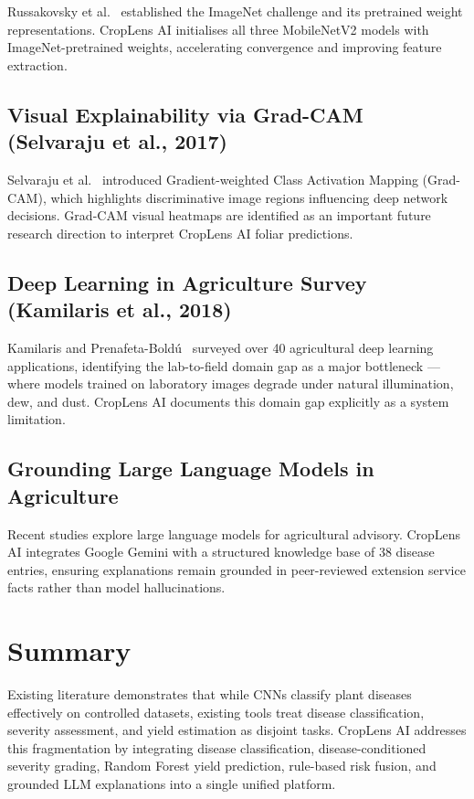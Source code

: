 Russakovsky et al.~\cite{russakovsky2015} established the ImageNet challenge and its pretrained weight representations. CropLens AI initialises all three MobileNetV2 models with ImageNet-pretrained weights, accelerating convergence and improving feature extraction.

\subsection{Visual Explainability via Grad-CAM (Selvaraju et al., 2017)}

Selvaraju et al.~\cite{selvaraju2017} introduced Gradient-weighted Class Activation Mapping (Grad-CAM), which highlights discriminative image regions influencing deep network decisions. Grad-CAM visual heatmaps are identified as an important future research direction to interpret CropLens AI foliar predictions.

\subsection{Deep Learning in Agriculture Survey (Kamilaris et al., 2018)}

Kamilaris and Prenafeta-Bold\'{u}~\cite{kamilaris2018} surveyed over 40 agricultural deep learning applications, identifying the lab-to-field domain gap as a major bottleneck --- where models trained on laboratory images degrade under natural illumination, dew, and dust. CropLens AI documents this domain gap explicitly as a system limitation.

\subsection{Grounding Large Language Models in Agriculture}

Recent studies explore large language models for agricultural advisory. CropLens AI integrates Google Gemini with a structured knowledge base of 38 disease entries, ensuring explanations remain grounded in peer-reviewed extension service facts rather than model hallucinations.

\section{Summary}

Existing literature demonstrates that while CNNs classify plant diseases effectively on controlled datasets, existing tools treat disease classification, severity assessment, and yield estimation as disjoint tasks. CropLens AI addresses this fragmentation by integrating disease classification, disease-conditioned severity grading, Random Forest yield prediction, rule-based risk fusion, and grounded LLM explanations into a single unified platform.

